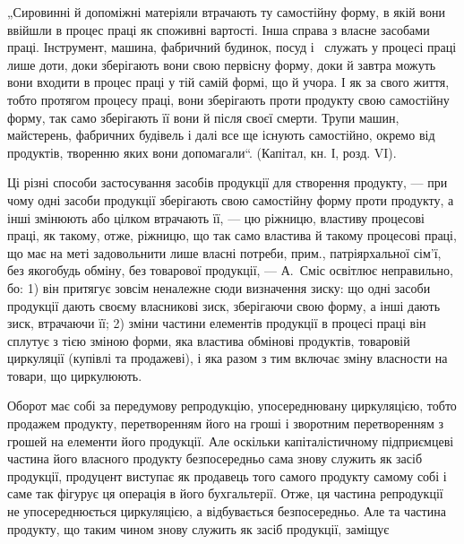 „Сировинні й допоміжні матеріяли втрачають ту самостійну форму, в
якій вони ввійшли в процес праці як споживні вартості. Інша справа
з власне засобами праці. Інструмент, машина, фабричний будинок, посуд
і~ служать у процесі праці лише доти, доки зберігають вони
свою первісну форму, доки й завтра можуть вони входити в процес праці
у тій самій формі, що й учора. І як за свого життя, тобто протягом
процесу праці, вони зберігають проти продукту свою самостійну форму,
так само зберігають її вони й після своєї смерти. Трупи машин, майстерень,
фабричних будівель і далі все ще існують самостійно, окремо
від продуктів, творенню яких вони допомагали“. (Капітал, кн. І, розд. VI).

Ці різні способи застосування засобів продукції для створення продукту,
— при чому одні засоби продукції зберігають свою самостійну форму
проти продукту, а інші змінюють або цілком втрачають її, — цю ріжницю,
властиву процесові праці, як такому, отже, ріжницю, що так само
властива й такому процесові праці, що має на меті задовольнити лише
власні потреби, прим., патріярхальної сім’ї, без якогобудь обміну, без
товарової продукції, — А.~Сміс освітлює неправильно, бо: 1) він притягує
зовсім неналежне сюди визначення зиску: що одні засоби продукції дають
своєму власникові зиск, зберігаючи свою форму, а інші дають зиск,
втрачаючи її; 2) зміни частини елементів продукції в процесі праці він
сплутує з тією зміною форми, яка властива обмінові продуктів, товаровій
циркуляції (купівлі та продажеві), і яка разом з тим включає зміну
власности на товари, що циркулюють.

Оборот має собі за передумову репродукцію, упосереднювану циркуляцією,
тобто продажем продукту, перетворенням його на гроші і зворотним
перетворенням з грошей на елементи його продукції. Але оскільки
капіталістичному підприємцеві частина його власного продукту безпосередньо
сама знову служить як засіб продукції, продуцент виступає як
продавець того самого продукту самому собі і саме так фігурує ця операція
в його бухгальтерії. Отже, ця частина репродукції не упосереднюється
циркуляцією, а відбувається безпосередньо. Але та частина продукту,
що таким чином знову служить як засіб продукції, заміщує
\parbreak{}  %
